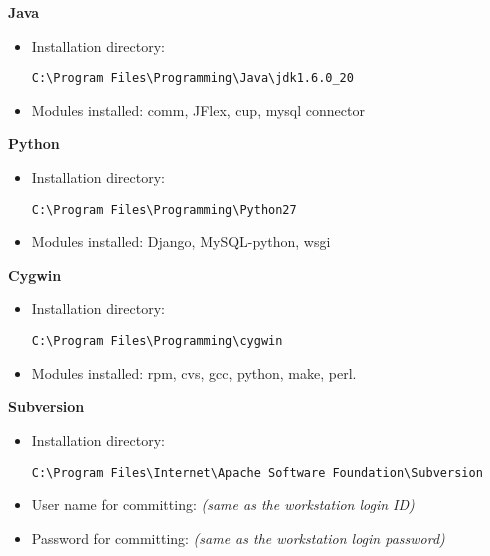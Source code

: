 \textbf{Java}
\begin{itemize}
\item Installation directory: \begin{verbatim}C:\Program Files\Programming\Java\jdk1.6.0_20\end{verbatim}
\item Modules installed: comm, JFlex, cup, mysql connector
\end{itemize}
\textbf{Python}
\begin{itemize}
\item Installation directory: \begin{verbatim}C:\Program Files\Programming\Python27\end{verbatim}
\item Modules installed: Django, MySQL-python, wsgi
\end{itemize}
\textbf{Cygwin}
\begin{itemize}
\item Installation directory: \begin{verbatim}C:\Program Files\Programming\cygwin\end{verbatim}
\item Modules installed: rpm, cvs, gcc, python, make, perl.
\end{itemize}
\textbf{Subversion}
\begin{itemize}
\item Installation directory: \begin{verbatim}C:\Program Files\Internet\Apache Software Foundation\Subversion\end{verbatim}
\item User name for committing: \emph{(same as the workstation login ID)}
\item Password for committing: \emph{(same as the workstation login password)}
\end{itemize}
